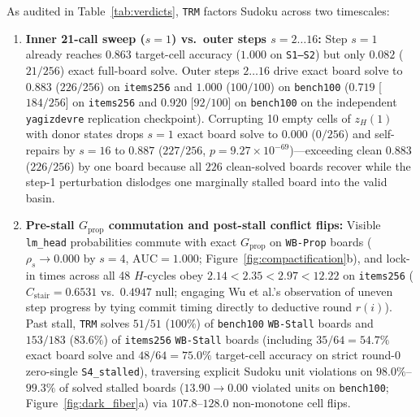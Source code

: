 \documentclass[10pt,letterpaper]{article}
\newcommand{\Gprop}{G_{\mathrm{prop}}}
\begin{document}
As audited in Table~\ref{tab:verdicts}, \texttt{TRM} factors Sudoku across two timescales:
\begin{enumerate}[topsep=3pt,itemsep=2pt]
  \item \textbf{Inner 21-call sweep ($s=1$) vs.\ outer steps $s=2\dots 16$:} Step $s=1$ already reaches $0.863$ target-cell accuracy ($1.000$ on \texttt{S1--S2}) but only $0.082$ ($21/256$) exact full-board solve. Outer steps $2\dots 16$ drive exact board solve to $\mathbf{0.883}$ ($226/256$) on \texttt{items256} and $\mathbf{1.000}$ ($100/100$) on \texttt{bench100} ($\mathbf{0.719}$ [$184/256$] on \texttt{items256} and $\mathbf{0.920}$ [$92/100$] on \texttt{bench100} on the independent \texttt{yagizdevre} replication checkpoint). Corrupting 10 empty cells of $z_H(1)$ with donor states drops $s=1$ exact board solve to $0.000$ ($0/256$) and self-repairs by $s=16$ to $\mathbf{0.887}$ ($227/256$, $p=9.27\times 10^{-69}$)—exceeding clean $0.883$ ($226/256$) by one board because all $226$ clean-solved boards recover while the step-1 perturbation dislodges one marginally stalled board into the valid basin.
  \item \textbf{Pre-stall $\Gprop$ commutation and post-stall conflict flips:} Visible \texttt{lm\_head} probabilities commute with exact $\Gprop$ on \texttt{WB-Prop} boards ($\rho_s \to 0.000$ by $s=4$, $\mathrm{AUC}=1.000$; Figure~\ref{fig:compactification}b), and lock-in times across all 48 $H$-cycles obey $2.14 < 2.35 < 2.97 < 12.22$ on \texttt{items256} ($C_{\mathrm{stair}}=0.6531$ vs.\ $0.4947$ null; engaging Wu et al.'s \cite{wu2026shared} observation of uneven step progress by tying commit timing directly to deductive round $r(i)$). Past stall, \texttt{TRM} solves $51/51$ ($100\%$) of \texttt{bench100} \texttt{WB-Stall} boards and $153/183$ ($83.6\%$) of \texttt{items256} \texttt{WB-Stall} boards (including $35/64 = 54.7\%$ exact board solve and $48/64 = 75.0\%$ target-cell accuracy on strict round-0 zero-single \texttt{S4\_stalled}), traversing explicit Sudoku unit violations on $98.0\%$--$99.3\%$ of solved stalled boards ($13.90 \to 0.00$ violated units on \texttt{bench100}; Figure~\ref{fig:dark_fiber}a) via $107.8$--$128.0$ non-monotone cell flips.
\end{enumerate}
\end{document}

